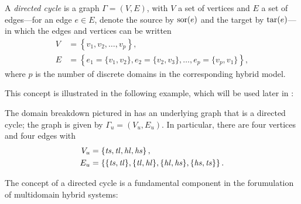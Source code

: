 
\begin{definition}
  A {\em directed cycle} is a graph $\Gamma = (V, E)$, with $V$ a set of vertices and $E$ a set of edges---for an edge $e \in E$, denote the source by $\mathrm{sor}(e)$ and the target by $\mathrm{tar}(e)$---in which the edges and vertices can be written
  \begin{align}
    \nonumber
    V &= \left\{v_{1}, v_{2}, \ldots, v_{p}\right\},\\
    \label{eqn:directedcyclep}
    E &= \left\{e_{1} = \{v_{1}, v_{2}\}, e_{2} = \{v_{2}, v_{3}\}, \ldots, e_{p} = \{v_{p}, v_{1}\}\right\},
  \end{align}
  where $p$ is the number of discrete domains in the corresponding hybrid model.
\end{definition}

This concept is illustrated in the following example, which will be used later in :

\begin{exmp} \label{universalgraph}
  The domain breakdown pictured in  has an underlying graph that is a directed cycle;
  the graph is given by $\Gamma_{u} = (V_{u}, E_{u})$.
  In particular, there are four vertices and four edges with
  \begin{align}
    \nonumber
    V_u &= \left\{\mathit{ts}, \mathit{tl}, \mathit{hl}, \mathit{hs}\right\},\\
    E_u &= \left\{\{\mathit{ts}, \mathit{tl}\}, \{\mathit{tl}, \mathit{hl}\}, \{\mathit{hl}, \mathit{hs}\}, \{\mathit{hs}, \mathit{ts}\}\right\}.
  \end{align}
\end{exmp}

The concept of a directed cycle is a fundamental component in the forumulation of multidomain hybrid systems:

